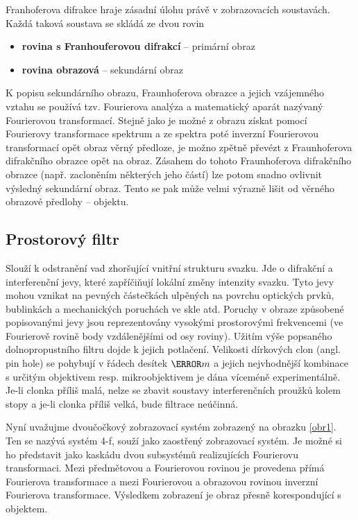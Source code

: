 \documentclass[11pt,a4paper]{article}
\begin{document}
Franhoferova difrakce hraje zásadní úlohu právě v zobrazovacích soustavách. Každá taková soustava
se skládá ze dvou rovin

\begin{itemize}
\item \textbf{rovina s Franhouferovou difrakcí} -- primární obraz
\item \textbf{rovina obrazová} -- sekundární obraz
\end{itemize} 

K popisu sekundárního obrazu, Fraunhoferova obrazce a jejich vzájemného vztahu se používá tzv. 
Fourierova analýza a matematický aparát nazývaný Fourierovou transformací. 
Stejně jako je možné z obrazu získat pomocí Fourierovy transformace spektrum a ze spektra poté
inverzní Fourierovou transformací opět obraz věrný předloze, je možno zpětně převézt z Fraunhoferova 
difrakčního obrazce opět na obraz.
Zásahem do tohoto Fraunhoferova difrakčního obrazce (např. zacloněním 
některých jeho částí) lze potom snadno ovlivnit výsledný sekundární obraz. Tento se pak může 
velmi výrazně lišit od věrného obrazové předlohy -- objektu. 

\subsection{Prostorový filtr}
Slouží k odstranění vad zhoršující vnitřní strukturu svazku. Jde o difrakční a interferenční jevy,
které zapříčiňují lokální změny intenzity svazku. Tyto jevy mohou vznikat na pevných
částečkách ulpěných na povrchu optických prvků, bublinkách a mechanických poruchách ve skle
atd. Poruchy v obraze způsobené popisovanými jevy jsou reprezentovány vysokými
prostorovými frekvencemi (ve Fourierově rovině body vzdálenějšími od osy roviny). Užitím
výše popsaného dolnopropustního filtru dojde k jejich potlačení.
Velikosti dírkových clon (angl. pin hole) se pohybují v řádech desítek $\micro m$ a jejich nejvhodnější
kombinace s určitým objektivem resp. mikroobjektivem je dána víceméně experimentálně. Je-li
clonka příliš malá, nelze se zbavit soustavy interferenčních proužků kolem stopy a je-li clonka
příliš velká, bude filtrace neúčinná.

Nyní uvažujme dvoučočkový zobrazovací systém zobrazený na obrazku \ref{obr1}. Ten se nazývá 
systém 4-f, souží jako zaostřený zobrazovací systém. Je možné si ho představit jako kaskádu dvou
subsystémů realizujících Fourierovu transformaci. Mezi předmětovou a Fourierovou rovinou je
provedena přímá Fourierova transformace a mezi Fourierovou a obrazovou rovinou inverzní
Fourierova transformace. Výsledkem zobrazení je obraz přesně korespondující s objektem.
\end{document}
